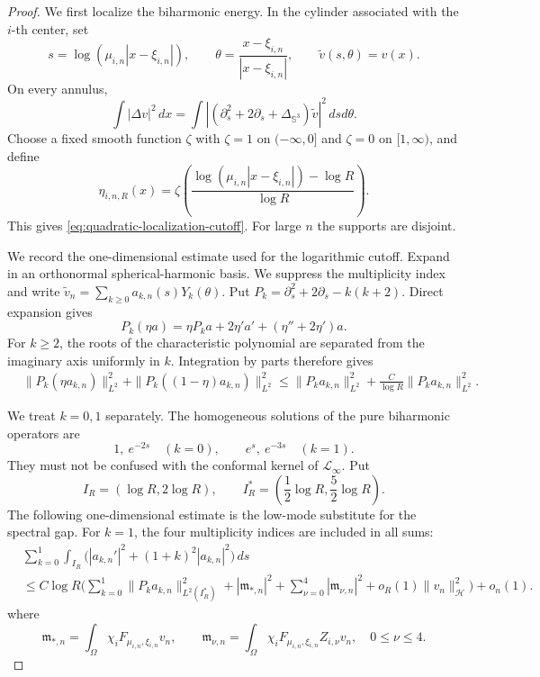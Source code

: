 \documentclass[10pt,a4paper]{amsart}
\begin{document}
\begin{proof}
We first localize the biharmonic energy. In the cylinder associated
with the $i$-th center, set
\[
s=\log(\mu_{i,n}|x-\xi_{i,n}|),
\qquad
\theta=\frac{x-\xi_{i,n}}{|x-\xi_{i,n}|},
\qquad
\widetilde v(s,\theta)=v(x).
\]
On every annulus,
\begin{equation}\label{eq:Emden-Fowler-biharmonic}
\int |\Delta v|^2\,dx
=\int
\left|\left(\partial_s^2+2\partial_s
+\Delta_{\mathbb S^3}\right)\widetilde v\right|^2
\,dsd\theta.
\end{equation}
Choose a fixed smooth function $\zeta$ with $\zeta=1$ on
$(-\infty,0]$ and $\zeta=0$ on $[1,\infty)$, and define
\[
\eta_{i,n,R}(x)
=\zeta\left(
\frac{\log(\mu_{i,n}|x-\xi_{i,n}|)-\log R}
{\log R}
\right).
\]
This gives \eqref{eq:quadratic-localization-cutoff}. For large $n$ the
supports are disjoint.

We record the one-dimensional estimate used for the logarithmic
cutoff. Expand in an orthonormal spherical-harmonic basis. We suppress
the multiplicity index and write
$\widetilde v_n=\sum_{k\geq0}a_{k,n}(s)Y_k(\theta)$. Put
$P_k=\partial_s^2+2\partial_s-k(k+2)$. Direct expansion gives
\[
P_k(\eta a)=\eta P_ka+2\eta'a'
+(\eta''+2\eta')a.
\]
For $k\geq2$, the roots of the characteristic polynomial are
separated from the imaginary axis uniformly in $k$. Integration by
parts therefore gives
\begin{equation}\label{eq:high-mode-logarithmic-cutoff}
\begin{aligned}
&\|P_k(\eta a_{k,n})\|_{L^2}^2
+\|P_k((1-\eta)a_{k,n})\|_{L^2}^2\leq
\|P_ka_{k,n}\|_{L^2}^2
+\frac{C}{\log R}\|P_ka_{k,n}\|_{L^2}^2.
\end{aligned}
\end{equation}

We treat $k=0,1$ separately.  The homogeneous solutions of the
pure biharmonic operators are
\[
1,\ e^{-2s}\quad(k=0),
\qquad
e^s,\ e^{-3s}\quad(k=1).
\]
They must not be confused with the conformal kernel of
$\mathcal L_\infty$.  Put
\[
I_R=(\log R,2\log R),
\qquad
I_R^*=\left(\frac12\log R,\frac52\log R\right).
\]
The following one-dimensional estimate is the low-mode substitute
for the spectral gap.  For $k=1$, the four multiplicity indices are
included in all sums:
\begin{equation}\label{eq:low-mode-variation-bound}
\begin{aligned}
&\sum_{k=0}^1\int_{I_R}
\bigl(|a_{k,n}'|^2+(1+k)^2|a_{k,n}|^2\bigr)\,ds\\
&\leq C\log R\Bigg(
\sum_{k=0}^1\|P_ka_{k,n}\|_{L^2(I_R^*)}^2
+|\mathfrak m_{*,n}|^2
+\sum_{\nu=0}^4|\mathfrak m_{\nu,n}|^2
+o_R(1)\|v_n\|_{\mathcal H}^2\Bigg)+o_n(1).
\end{aligned}
\end{equation}
where
\[
\mathfrak m_{*,n}=\int_\Omega
\chi_iF_{\mu_{i,n},\xi_{i,n}}v_n,
\qquad
\mathfrak m_{\nu,n}=\int_\Omega
\chi_iF_{\mu_{i,n},\xi_{i,n}}Z_{i,\nu}v_n,
\quad0\leq\nu\leq4.
\]


\end{proof}
\end{document}
